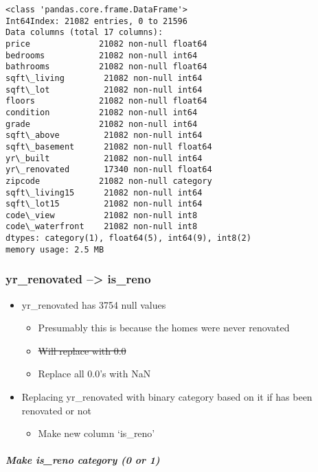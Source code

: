 \documentclass[11pt]{article}
\providecommand{\tightlist}{%
      \setlength{\itemsep}{0pt}\setlength{\parskip}{0pt}}
\begin{document}
    \begin{Verbatim}[commandchars=\\\{\}]
<class 'pandas.core.frame.DataFrame'>
Int64Index: 21082 entries, 0 to 21596
Data columns (total 17 columns):
price              21082 non-null float64
bedrooms           21082 non-null int64
bathrooms          21082 non-null float64
sqft\_living        21082 non-null int64
sqft\_lot           21082 non-null int64
floors             21082 non-null float64
condition          21082 non-null int64
grade              21082 non-null int64
sqft\_above         21082 non-null int64
sqft\_basement      21082 non-null float64
yr\_built           21082 non-null int64
yr\_renovated       17340 non-null float64
zipcode            21082 non-null category
sqft\_living15      21082 non-null int64
sqft\_lot15         21082 non-null int64
code\_view          21082 non-null int8
code\_waterfront    21082 non-null int8
dtypes: category(1), float64(5), int64(9), int8(2)
memory usage: 2.5 MB

    \end{Verbatim}

    \hypertarget{yr_renovated-is_reno}{%
\subsubsection{yr\_renovated --\textgreater{}
is\_reno}\label{yr_renovated-is_reno}}

\begin{itemize}
\tightlist
\item
  yr\_renovated has 3754 null values

  \begin{itemize}
  \tightlist
  \item
    Presumably this is because the homes were never renovated
  \item
    \sout{Will replace with 0.0}
  \item
    Replace all 0.0's with NaN
  \end{itemize}
\item
  Replacing yr\_renovated with binary category based on it if has been
  renovated or not

  \begin{itemize}
  \tightlist
  \item
    Make new column `is\_reno'
  \end{itemize}
\end{itemize}

    \hypertarget{make-is_reno-category-0-or-1}{%
\subparagraph{Make is\_reno category (0 or
1)}\label{make-is_reno-category-0-or-1}}
\end{document}
